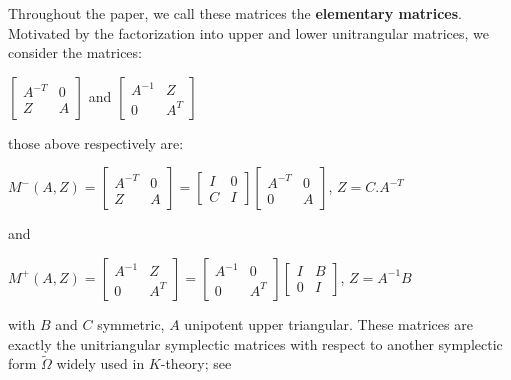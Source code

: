 \documentclass[10pt]{amsart}
\theoremstyle{remark}
\begin{document}
Throughout the paper, we call these matrices the \textbf{elementary matrices}. 
\iffalse
Motivated by the factorization into upper and lower unitrangular matrices, we consider the matrices:
\begin{center}
    $\left[\begin{array}{ccc} A^{-T} & 0 \\ Z & A\end{array}\right] $ and $ \left[\begin{array}{ccc} A^{-1} & Z \\ 0 & A^{T}\end{array}\right]$
\end{center}
those above respectively are: 
\begin{center}
       $M^{-}(A,Z) = \left[\begin{array}{ccc} A^{-T} & 0 \\ Z & A\end{array}\right] = \left[\begin{array}{ccc} I & 0 \\ C & I\end{array}\right]\left[\begin{array}{ccc} A^{-T} & 0 \\ 0 & A\end{array}\right]$, $Z = C.A^{-T}$
    \end{center}
    and
    \begin{center}
    $M^{+}(A,Z)= \left[\begin{array}{ccc} A^{-1} & Z \\ 0 & A^{T}\end{array}\right] =\left[\begin{array}{ccc} A^{-1} & 0 \\ 0 & A^T\end{array}\right]\left[\begin{array}{ccc} I & B \\ 0 & I\end{array}\right]  $, $Z = A^{-1}B$
    \end{center}
 with $B$ and $C$ symmetric, $A$ unipotent upper triangular. These matrices are exactly the unitriangular
symplectic matrices with respect to another
symplectic form $\tilde \Omega$ widely used in $K$-theory; see
\end{document}
